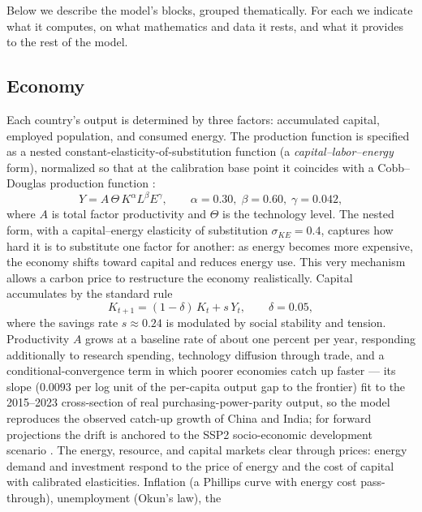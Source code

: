 \documentclass[11pt,a4paper]{article}
\begin{document}
Below we describe the model's blocks, grouped thematically. For each we indicate what it computes,
on what mathematics and data it rests, and what it provides to the rest of the model.

\subsection{Economy}

Each country's output is determined by three factors: accumulated capital, employed population,
and consumed energy. The production function is specified as a nested constant-elasticity-of-sub\-sti\-tu\-tion
function (a \emph{capital--labor--energy} form), normalized so that at the calibration base point
it coincides with a Cobb--Douglas production function \citep{arrow1961}:
\begin{equation}
Y = A \, \Theta \, K^{\alpha} L^{\beta} E^{\gamma},
\qquad \alpha = 0.30,\; \beta = 0.60,\; \gamma = 0.042,
\label{eq:prod}
\end{equation}
where $A$ is total factor productivity and $\Theta$ is the technology level. The nested form, with a
capital--energy elasticity of substitution $\sigma_{KE}=0.4$, captures how hard it is to substitute
one factor for another: as energy becomes more expensive, the economy shifts toward capital and
reduces energy use. This very mechanism allows a carbon price to restructure the economy
realistically. Capital accumulates by the standard rule
\begin{equation}
K_{t+1} = (1-\delta)\,K_t + s\,Y_t, \qquad \delta = 0.05,
\label{eq:capital}
\end{equation}
where the savings rate $s\approx0.24$ is modulated by social stability and tension. Productivity $A$
grows at a baseline rate of about one percent per year, responding additionally to research
spending, technology diffusion through trade, and a conditional-convergence term in which poorer
economies catch up faster --- its slope ($0.0093$ per log unit of the per-capita output gap to the
frontier) fit to the 2015--2023 cross-section of real purchasing-power-parity output, so the model
reproduces the observed catch-up growth of China and India; for forward projections the drift is
anchored to the SSP2 socio-economic development scenario \citep{riahi2017}. The energy, resource, and capital markets clear through prices: energy demand and
investment respond to the price of energy and the cost of capital with calibrated elasticities.
Inflation (a Phillips curve with energy cost pass-through), unemployment (Okun's law), the
\end{document}
